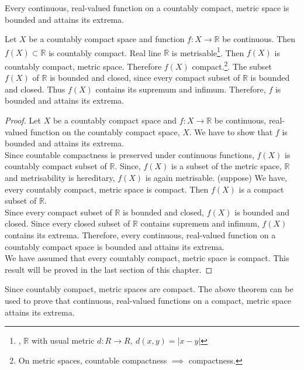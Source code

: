 \begin{theorem}
	Every continuous, real-valued function on a countably compact, metric space is bounded and attains its extrema.\cite[11.1.7]{joshi}
\end{theorem}
\begin{synopsis}
	Let $X$ be a countably compact space and function $f : X \to \mathbb{R}$ be continuous. Then $f(X) \subset \mathbb{R}$ is countably compact. Real line $\mathbb{R}$ is metrisable\footnote{\cite[4.2 Example 4]{joshi}, $\mathbb{R}$ with usual metric $d:R \to R,\ d(x,y) = |x-y|$}. Then $f(X)$ is countably compact, metric space. Therefore $f(X)$ compact.\footnote{\cite[11.1.11]{joshi} On metric spaces, countable compactness $\implies$ compactness.}. The subset $f(X)$ of $\mathbb{R}$ is bounded and closed, since every compact subset of $\mathbb{R}$ is bounded and closed. Thus $f(X)$ contains its supremum and infimum. Therefore, $f$ is bounded and attains its extrema.
\end{synopsis}
\begin{proof}
	Let $X$ be a countably compact space and $f : X \to \mathbb{R}$ be continuous, real-valued function on the countably compact space, $X$. We have to show that $f$ is bounded and attains its extrema.\\
	
	Since countable compactness is preserved under continuous functions, $f(X)$ is countably compact subset of $\mathbb{R}$. Since, $f(X)$ is a subset of the metric space, $\mathbb{R}$ and metrisability is hereditary, $f(X)$ is again metrisable. (suppose) We have, every countably compact, metric space is compact. Then $f(X)$ is a compact subset of $\mathbb{R}$.\\

	Since every compact subset of $\mathbb{R}$ is bounded and closed, $f(X)$ is bounded and closed. Since every closed subset of $\mathbb{R}$ contains supremem and infimum, $f(X)$ contains its extrema. Therefore, every continuous, real-valued function on a countably compact space is bounded and attains its extrema.\\

	We have assumed that every countably compact, metric space is compact. This result will be proved in the last section of this chapter.
\end{proof}

\begin{remark}
	Since countably compact, metric spaces are compact. The above theorem can be used to prove that continuous, real-valued functions on a compact, metric space attains its extrema.
\end{remark}

